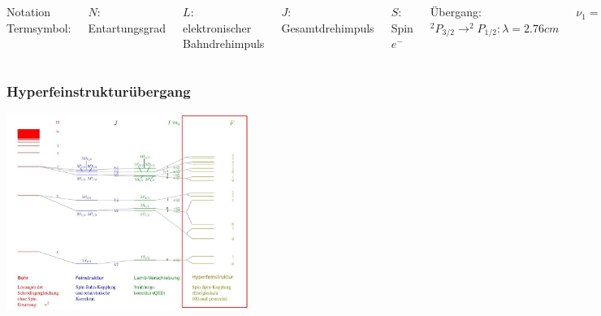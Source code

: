 \begin{frame}
	\begin{columns}
		
		Notation Termsymbol: 

		\vspace{1cm}	
				
		$N:$ Entartungsgrad
		
		$L:$ elektronischer Bahndrehimpuls
		
		$J:$ Gesamtdrehimpuls
		
		$S:$ Spin $e^-$

		\vspace{1cm}
		Übergang: $^2P_{3/2} \rightarrow ^2P_{1/2}: \lambda = 2.76cm$
				
		$\nu_1 = \dfrac{c}{\lambda_1} = 10,9 GHz $
		\vspace{.5cm}
				
		\includegraphics[width = 5cm]{./pictures/orbitale}
		
		\includegraphics[width = 5cm]{./pictures/wasserstoffSpektrum}
			
		\includegraphics[width = 5cm]{./pictures/fine_structure_hydrogen}
	\end{columns}
\end{frame}

\begin{frame}
	\frametitle {Hyperfeinstrukturübergang}
	
	\begin{center}
		\includegraphics[width = 8cm]{./pictures/energieniveaus3}
	\end{center}
	
\end{frame}

